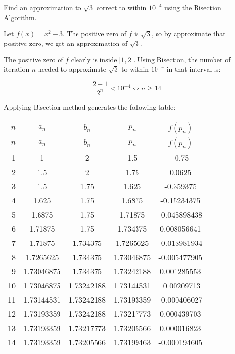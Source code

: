 \documentclass[../../Assignments.tex]{subfiles}
\begin{document}
\begin{exercise}
    Find an approximation to \(\sqrt{3}\) correct to within \(10^{−4}\) using
    the Bisection Algorithm.
\end{exercise}

\begin{solution}
    Let \(f(x) = x^2 - 3\). The positive zero of \(f\) is \(\sqrt{3}\), so by
    approximate that positive zero, we get an approximation of \(\sqrt{3}\).

    The positive zero of \(f\) clearly is inside \(\interval{1}{2}\). Using
    Bisection, the number of iteration \(n\) needed to approximate \(\sqrt{3}\)
    to within \(10^{-4}\) in that interval is:

    \[\frac{2 - 1}{2^n} < 10^{-4} \iff n \geq 14\]

    Applying Bisection method generates the following table:

    \begin{longtable}{r S[table-format=1.8] S[table-format=1.8] S[table-format=1.8] S[table-format=-1.9]}
        \toprule
        \(n\)  &   {\(a_n\)}   &   {\(b_n\)}   &   {\(p_n\)}   &  {\(f(p_n)\)}  \\
        \midrule
        \endfirsthead
        \(n\)  &   {\(a_n\)}   &   {\(b_n\)}   &   {\(p_n\)}   &  {\(f(p_n)\)}  \\
        \midrule
          &  1            &  2            &  1.5          &  -0.75         \\
            2  &  1.5          &  2            &  1.75         &   0.0625       \\
            3  &  1.5          &  1.75         &  1.625        &  -0.359375     \\
            4  &  1.625        &  1.75         &  1.6875       &  -0.15234375   \\
            5  &  1.6875       &  1.75         &  1.71875      &  -0.045898438  \\
            6  &  1.71875      &  1.75         &  1.734375     &   0.008056641  \\
            7  &  1.71875      &  1.734375     &  1.7265625    &  -0.018981934  \\
            8  &  1.7265625    &  1.734375     &  1.73046875   &  -0.005477905  \\
            9  &  1.73046875   &  1.734375     &  1.73242188   &   0.001285553  \\
           10  &  1.73046875   &  1.73242188   &  1.73144531   &  -0.00209713   \\
           11  &  1.73144531   &  1.73242188   &  1.73193359   &  -0.000406027  \\
           12  &  1.73193359   &  1.73242188   &  1.73217773   &   0.000439703  \\
           13  &  1.73193359   &  1.73217773   &  1.73205566   &   0.000016823  \\
           14  &  1.73193359   &  1.73205566   &  1.73199463   &  -0.000194605  \\
       \bottomrule
    \end{longtable}


\end{solution}
\end{document}
